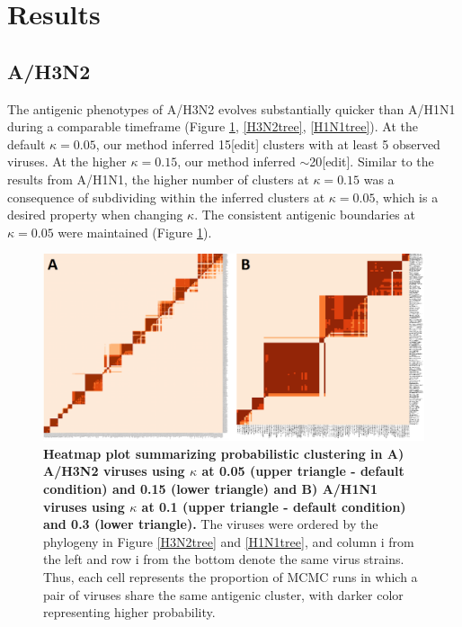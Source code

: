 \documentclass[11pt,oneside,letterpaper]{article}
\begin{document}
\newpage







\newpage

\section*{Results}


\subsection*{A/H3N2}
The antigenic phenotypes of A/H3N2 evolves substantially quicker than A/H1N1 during a comparable timeframe (Figure \ref{heatmaps}, \ref{H3N2tree}, \ref{H1N1tree}).  %
At the default $\kappa=0.05$, our method inferred 15[edit] clusters with at least 5 observed viruses.  
At the higher $\kappa=0.15$, our method inferred $\sim$20[edit]. 
Similar to the results from A/H1N1, the higher number of clusters at $\kappa=0.15$ was a consequence of subdividing within the inferred clusters at $\kappa=0.05$, which is a desired property when changing $\kappa$.
The consistent antigenic boundaries at $\kappa=0.05$ were maintained (Figure \ref{heatmaps}). 

\begin{figure}[h]
	\centering		
	\includegraphics[width=1\textwidth]{figures/custom/H3N2andH1N1heatmapLowRes}
	\caption{\textbf{Heatmap plot summarizing probabilistic clustering in A) A/H3N2 viruses using $\kappa$ at 0.05 (upper triangle - default condition) and 0.15 (lower triangle) and  B) A/H1N1 viruses using $\kappa$ at 0.1 (upper triangle - default condition) and 0.3 (lower triangle).}
The viruses were ordered by the phylogeny in Figure \ref{H3N2tree} and \ref{H1N1tree}, and column i from the left and row i from the bottom denote the same virus strains.
Thus, each cell represents the proportion of MCMC runs in which a pair of viruses share the same antigenic cluster, with darker color representing higher probability.  
	 		} 
	\label{heatmaps} 
\end{figure}
\end{document}
